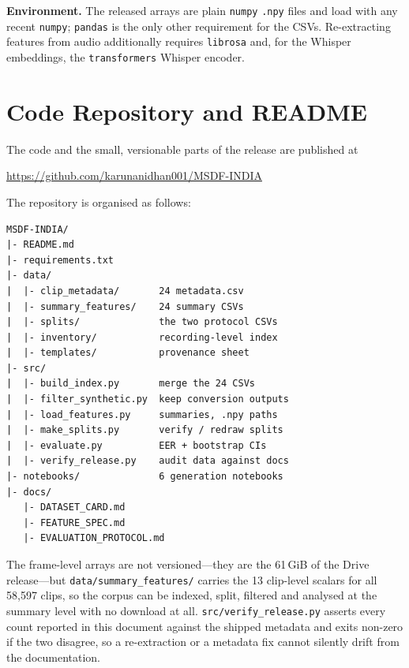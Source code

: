\documentclass[conference]{IEEEtran}
\begin{document}
\noindent\textbf{Environment.} The released arrays are plain \texttt{numpy} \texttt{.npy}
files and load with any recent \texttt{numpy}; \texttt{pandas} is the only other
requirement for the CSVs. Re-extracting features from audio additionally requires
\texttt{librosa} and, for the Whisper embeddings, the \texttt{transformers} Whisper
encoder.

\section{Code Repository and README}
The code and the small, versionable parts of the release are published at
\begin{center}
\url{https://github.com/karunanidhan001/MSDF-INDIA}
\end{center}

\noindent The repository is organised as follows:

\begin{scriptsize}
\begin{verbatim}
MSDF-INDIA/
|- README.md
|- requirements.txt
|- data/
|  |- clip_metadata/       24 metadata.csv
|  |- summary_features/    24 summary CSVs
|  |- splits/              the two protocol CSVs
|  |- inventory/           recording-level index
|  |- templates/           provenance sheet
|- src/
|  |- build_index.py       merge the 24 CSVs
|  |- filter_synthetic.py  keep conversion outputs
|  |- load_features.py     summaries, .npy paths
|  |- make_splits.py       verify / redraw splits
|  |- evaluate.py          EER + bootstrap CIs
|  |- verify_release.py    audit data against docs
|- notebooks/              6 generation notebooks
|- docs/
   |- DATASET_CARD.md
   |- FEATURE_SPEC.md
   |- EVALUATION_PROTOCOL.md
\end{verbatim}
\end{scriptsize}

\noindent The frame-level arrays are not versioned---they are the 61\,GiB of the Drive
release---but \texttt{data/summary\_features/} carries the 13 clip-level scalars for all
58{,}597 clips, so the corpus can be indexed, split, filtered and analysed at the summary
level with no download at all. \texttt{src/verify\_release.py} asserts every count reported
in this document against the shipped metadata and exits non-zero if the two disagree, so a
re-extraction or a metadata fix cannot silently drift from the documentation.
\end{document}
